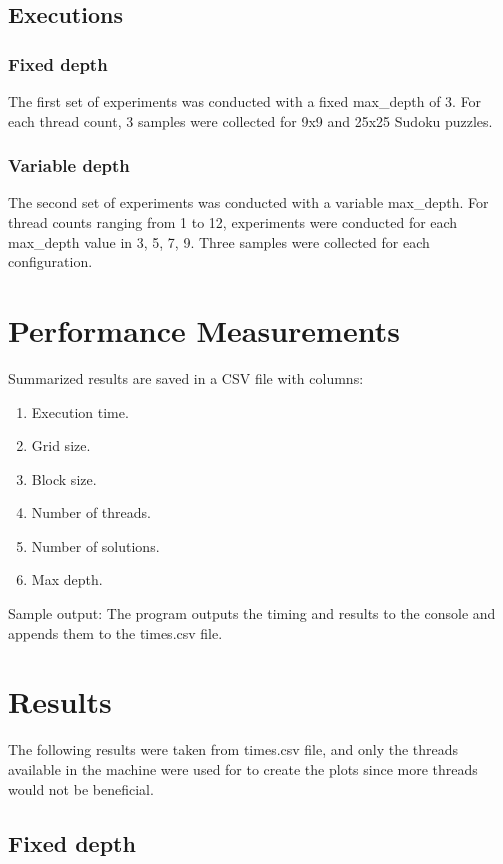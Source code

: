 \documentclass[a4paper,11pt]{article}
\begin{document}
\subsection{Executions}

\subsubsection{Fixed depth}

The first set of experiments was conducted with a fixed max\_depth of 3. For each thread count, 3 samples were collected for 9x9 and 25x25 Sudoku puzzles.

\subsubsection{Variable depth}
The second set of experiments was conducted with a variable max\_depth. For thread counts ranging from 1 to 12, experiments were conducted for each max\_depth value in {3, 5, 7, 9}. Three samples were collected for each configuration.


\section{Performance Measurements}

Summarized results are saved in a CSV file with columns:

\begin{enumerate}
    \item Execution time.
    \item Grid size.
    \item Block size.
    \item Number of threads.
    \item Number of solutions.
    \item Max depth.
\end{enumerate}

Sample output: The program outputs the timing and results to the console and appends them to the times.csv file.

\section{Results}

The following results were taken from times.csv file, and only the threads available in the machine were used for to create the plots since more threads would not be beneficial.

\subsection{Fixed depth}
\end{document}
